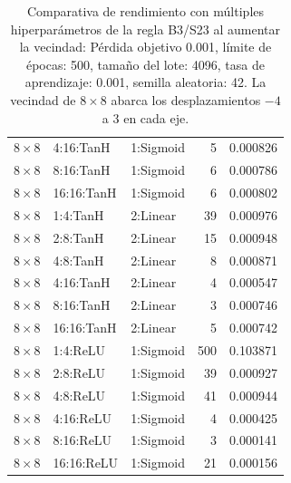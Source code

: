 \begin{table}[h]
\begin{tabular}{lllrr}
		$8\times8$ & 4:16:TanH & 1:Sigmoid & 5 & 0.000826 \\
		$8\times8$ & 8:16:TanH & 1:Sigmoid & 6 & 0.000786 \\
		$8\times8$ & 16:16:TanH & 1:Sigmoid & 6 & 0.000802 \\
		$8\times8$ & 1:4:TanH & 2:Linear & 39 & 0.000976 \\
		$8\times8$ & 2:8:TanH & 2:Linear & 15 & 0.000948 \\
		$8\times8$ & 4:8:TanH & 2:Linear & 8 & 0.000871 \\
		$8\times8$ & 4:16:TanH & 2:Linear & 4 & 0.000547 \\
		$8\times8$ & 8:16:TanH & 2:Linear & 3 & 0.000746 \\
		$8\times8$ & 16:16:TanH & 2:Linear & 5 & 0.000742 \\
		$8\times8$ & 1:4:ReLU & 1:Sigmoid & 500 & 0.103871 \\
		$8\times8$ & 2:8:ReLU & 1:Sigmoid & 39 & 0.000927 \\
		$8\times8$ & 4:8:ReLU & 1:Sigmoid & 41 & 0.000944 \\
		$8\times8$ & 4:16:ReLU & 1:Sigmoid & 4 & 0.000425 \\
		$8\times8$ & 8:16:ReLU & 1:Sigmoid & 3 & 0.000141 \\
		$8\times8$ & 16:16:ReLU & 1:Sigmoid & 21 & 0.000156 \\
		\bottomrule
	\end{tabular}
	\caption{Comparativa de rendimiento con múltiples hiperparámetros de la regla B3/S23 al aumentar la vecindad: Pérdida objetivo 0.001, límite de épocas: 500, tamaño del lote: 4096, tasa de aprendizaje: 0.001, semilla aleatoria: 42. La vecindad de $8\times8$ abarca los desplazamientos $-4$ a $3$ en cada eje.}
	\label{tab:nca_gol_vecindad}
\end{table}
